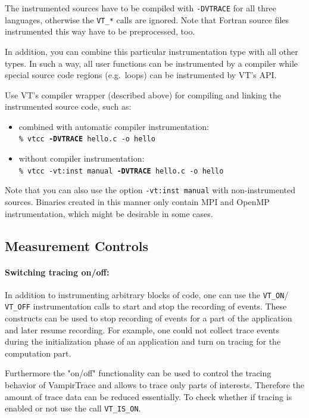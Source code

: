 \documentclass[a4paper,twoside,12pt,BCOR12mm]{scrbook}
\begin{document}
  The instrumented sources have to be compiled with \texttt{-DVTRACE} for
  all three languages, otherwise the \texttt{VT\_*} calls are ignored. 
  Note that Fortran source files instrumented this way have to be 
  preprocessed, too.

  In addition, you can combine this particular instrumentation type with all other types.
  In such a way, all user functions can be instrumented by a compiler while
  special source code regions (e.g.~loops) can be instrumented by VT's API.

  Use VT's compiler wrapper (described above) for compiling and linking the
  instrumented source code, such as:
\begin{itemize}
\item combined with automatic compiler instrumentation:\\[1ex]
\texttt{\% vtcc \textbf{-DVTRACE} hello.c -o hello}
\vspace{1ex}
\item without compiler instrumentation:\\[1ex]
\texttt{\% vtcc -vt:inst manual \textbf{-DVTRACE} hello.c -o hello}
\vspace{1ex}
\end{itemize}

  Note that you can also use the option \texttt{-vt:inst manual}
  with non-in\-stru\-men\-ted sources.
  Binaries created in this manner only contain MPI and OpenMP instrumentation,
  which might be desirable in some cases.

\subsection{Measurement Controls}
\label{subsec:measurement_controls}

\paragraph{Switching tracing on/off:}
  In addition to instrumenting arbitrary blocks of code, one can use the
  \texttt{VT\_ON}/ \texttt{VT\_OFF} instrumentation calls to start and stop
  the recording of events. These constructs can be used to stop recording
  of events for a part of the application and later resume recording. For
  example, one could not collect trace events during the initialization phase
  of an application and turn on tracing for the computation part.

  Furthermore the "on/off" functionality can be used to control the 
  tracing behavior of VampirTrace and allows to trace only parts of interests.
  Therefore the amount of trace data can be reduced essentially.
  To check whether if tracing is enabled or not use the call \texttt{VT\_IS\_ON}.
\end{document}
